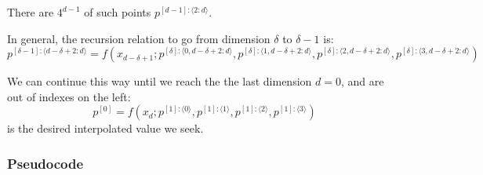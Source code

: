 \documentclass[11pt]{article}
\begin{document}
There are $4^{d-1}$ of such points $p^{[d-1]:\langle 2:d \rangle}$.

In general, the recursion relation to go from dimension $\delta$ to $\delta-1$ is:
\begin{equation}
p^{[\delta-1]: \langle d-\delta+2:d \rangle} = f \left ( 
x_{d-\delta+1} ; 
p^{[\delta]: \langle 0,d-\delta+2:d \rangle},
p^{[\delta]: \langle 1,d-\delta+2:d \rangle},
p^{[\delta]: \langle 2,d-\delta+2:d \rangle},
p^{[\delta]: \langle 3,d-\delta+2:d \rangle}
\right )
\label{eq:rec}
\end{equation}

We can continue this way until we reach the the last dimension $d=0$, and are out of indexes on the left:
\begin{equation}
p^{[0]} = f \left ( 
x_d ; 
p^{[1]: \langle 0 \rangle},
p^{[1]: \langle 1 \rangle},
p^{[1]: \langle 2 \rangle},
p^{[1]: \langle 3 \rangle}
\right )
\label{eq:soln}
\end{equation}
is the desired interpolated value we seek.


\subsubsection{Pseudocode}

\end{document}
